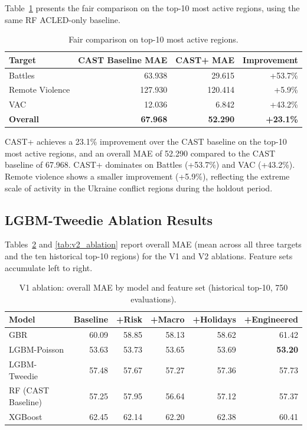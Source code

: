 \documentclass[12pt,a4paper]{article}
\begin{document}
Table~\ref{tab:top10_comparison} presents the fair comparison on the
top-10 most active regions, using the same RF ACLED-only baseline.

\begin{table}[h]
\centering
\caption{Fair comparison on top-10 most active regions.}
\label{tab:top10_comparison}
\begin{tabular}{lrrr}
\toprule
Target & CAST Baseline MAE & CAST+ MAE & Improvement \\
\midrule
Battles         & 63.938 & 29.615  & +53.7\% \\
Remote Violence & 127.930 & 120.414 & +5.9\%  \\
VAC             & 12.036 & 6.842   & +43.2\% \\
\midrule
\textbf{Overall} & \textbf{67.968} & \textbf{52.290} & \textbf{+23.1\%} \\
\bottomrule
\end{tabular}
\end{table}

CAST+ achieves a 23.1\% improvement over the CAST baseline on the
top-10 most active regions, and an overall MAE of 52.290 compared to
the CAST baseline of 67.968. CAST+ dominates on Battles (+53.7\%) and
VAC (+43.2\%). Remote violence shows a smaller improvement (+5.9\%),
reflecting the extreme scale of activity in the Ukraine conflict regions
during the holdout period.

\subsection{LGBM-Tweedie Ablation Results}

Tables~\ref{tab:v1_ablation} and \ref{tab:v2_ablation} report overall
MAE (mean across all three targets and the ten historical top-10
regions) for the V1 and V2 ablations. Feature sets accumulate
left to right.

\begin{table}[h]
\centering
\caption{V1 ablation: overall MAE by model and feature set
(historical top-10, 750 evaluations).}
\label{tab:v1_ablation}
\begin{tabular}{lrrrrr}
\toprule
\textbf{Model} & \textbf{Baseline} & \textbf{+Risk} & \textbf{+Macro} & \textbf{+Holidays} & \textbf{+Engineered} \\
\midrule
GBR                & 60.09 & 58.85 & 58.13 & 58.62 & 61.42 \\
LGBM-Poisson       & 53.63 & 53.73 & 53.65 & 53.69 & \textbf{53.20} \\
LGBM-Tweedie       & 57.48 & 57.67 & 57.27 & 57.36 & 57.73 \\
RF (CAST Baseline) & 57.25 & 57.95 & 56.64 & 57.12 & 57.37 \\
XGBoost            & 62.45 & 62.14 & 62.20 & 62.38 & 60.41 \\
\bottomrule
\end{tabular}
\end{table}
\end{document}
